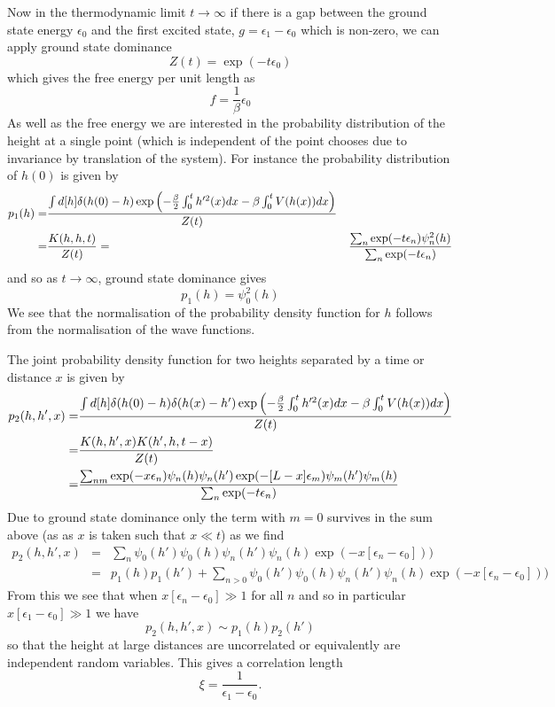 Now in the thermodynamic limit $t\to\infty$ if there is a gap between the ground state energy
$\epsilon_0$ and the first excited state, $g=\epsilon_1-\epsilon_0$ which is non-zero, we can apply ground state dominance 
\begin{equation}
Z(t) =\exp(-t\epsilon_0)
\end{equation}
which gives the free energy per unit length as
\begin{equation}
f=\frac{1}{\beta}\epsilon_0
\end{equation}
As well as the free energy we are interested in the probability distribution of the height at a single point (which is independent of the point chooses due to invariance by translation of the system). For instance the probability distribution of $h(0)$ is given by
\begin{eqnarray}
p_1(h)=& \frac{\int d[h]\delta(h(0)-h)\exp\left(-\frac{\beta}{2}\int_0^t h'^2(x) dx -\beta\int_0^t  V(h(x)) dx\right)}{Z(t)}\nonumber \\
=& \frac{K(h,h,t)}{Z(t)}
=& \frac{\sum_n \exp(-t\epsilon_n)\psi_n^2(h)}{\sum_n \exp(-t\epsilon_n)}
\end{eqnarray}
and so as $t\to\infty$, ground state dominance gives
\begin{equation}
p_1(h)= \psi_0^2(h)
\end{equation}
We see that the normalisation of the probability density function for $h$ follows from the 
normalisation of the wave functions.

The joint probability density function for two heights separated by a time or distance $x$ is given by
\begin{align}
p_2(h,h',x)=& \frac{\int d[h]\delta(h(0)-h)\delta(h(x)-h')\exp\left(-\frac{\beta}{2}\int_0^t h'^2(x) dx -\beta\int_0^t  V(h(x)) dx\right)}{Z(t)}\nonumber \\
=& \frac{K(h,h',x)K(h',h,t-x)}{Z(t)}  \nonumber \\
=& \frac{\sum_{nm} \exp(-x\epsilon_n)\psi_n(h)\psi_n(h')\exp(-[L-x]\epsilon_m)\psi_m(h')\psi_m(h)}{\sum_n \exp(-t\epsilon_n)}
\end{align}
Due to ground state dominance only the term with $m=0$ survives in the sum above (as
as $x$ is taken such that $x\ll t$) as we find
\begin{eqnarray}
p_2(h,h',x) &=& \sum_{n} \psi_0(h')\psi_0(h)\psi_n(h')\psi_n(h)\exp(-x[\epsilon_n-\epsilon_0]))\\
&=& p_1(h)p_1(h') + \sum_{n>0} \psi_0(h')\psi_0(h)\psi_n(h')\psi_n(h)\exp(-x[\epsilon_n-\epsilon_0]))
\label{eqp2}
\end{eqnarray}
From this we see that when $x[\epsilon_n-\epsilon_0] \gg1 $ for all $n$ and so in particular $x[\epsilon_1-\epsilon_0] \gg1$ we have 
\begin{equation}
p_2(h,h',x) \sim p_1(h)p_2(h')
\end{equation}
so that the height at large distances are uncorrelated or equivalently are independent random variables. This gives a correlation length
\begin{equation}
\xi = \frac{1}{\epsilon_1-\epsilon_0}.\label{clq}
\end{equation}

